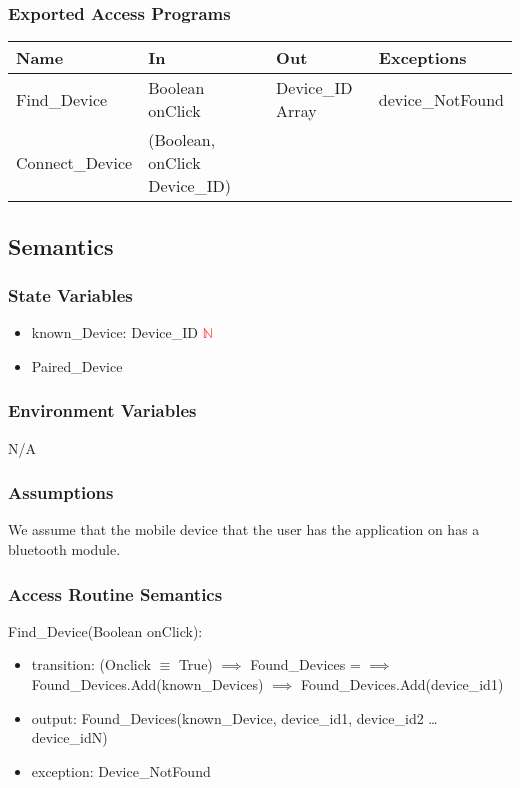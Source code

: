 \documentclass[12pt, titlepage]{article}
\begin{document}
\subsubsection{Exported Access Programs}

\begin{center}
\begin{tabular}{p{4cm} p{4cm} p{4cm} p{4cm}}
\hline
\textbf{Name} & \textbf{In} & \textbf{Out} & \textbf{Exceptions} \\
\hline
Find\_Device & Boolean onClick & Device\_ID Array & device\_NotFound\\
Connect\_Device & (Boolean, onClick Device\_ID) &  & \\
\hline
\end{tabular}
\end{center}

\subsection{Semantics}

\subsubsection{State Variables}

\begin{itemize}
  \item known\_Device: Device\_ID \textcolor{red}{$\mathbb{N}$}
  \item Paired\_Device
\end{itemize}


\subsubsection{Environment Variables}

N/A

\subsubsection{Assumptions}

We assume that the mobile device that the user has the application on has a bluetooth module.

\subsubsection{Access Routine Semantics}

\noindent Find\_Device(Boolean onClick):
\begin{itemize}
\item transition: (Onclick $\equiv$ True) $\implies$ Found\_Devices = {} $\implies$ Found\_Devices.Add(known\_Devices) $\implies$ Found\_Devices.Add(device\_id1) 
\item output: Found\_Devices(known\_Device, device\_id1, device\_id2 … device\_idN)
\item exception: Device\_NotFound 
\end{itemize}
\end{document}
